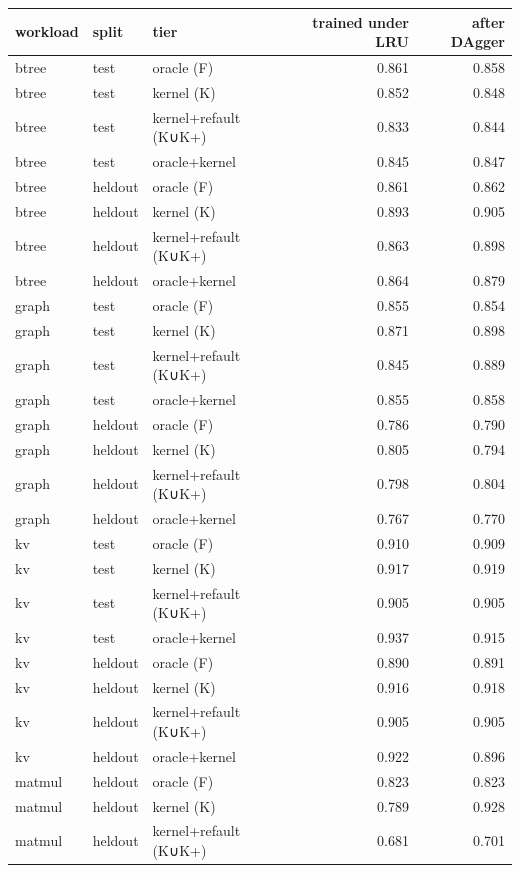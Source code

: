 \documentclass[10pt,a4paper]{article}
\begin{document}
{\footnotesize\setlength{\tabcolsep}{4pt}
\begin{longtable}{lllrr}
\toprule
\textbf{workload} & \textbf{split} & \textbf{tier} & \textbf{trained under LRU} & \textbf{after DAgger} \\ \midrule
\endhead
btree & test & oracle (F) & 0.861 & 0.858 \\
btree & test & kernel (K) & 0.852 & 0.848 \\
btree & test & kernel+refault (K∪K+) & 0.833 & 0.844 \\
btree & test & oracle+kernel & 0.845 & 0.847 \\
btree & heldout & oracle (F) & 0.861 & 0.862 \\
btree & heldout & kernel (K) & 0.893 & 0.905 \\
btree & heldout & kernel+refault (K∪K+) & 0.863 & 0.898 \\
btree & heldout & oracle+kernel & 0.864 & 0.879 \\
graph & test & oracle (F) & 0.855 & 0.854 \\
graph & test & kernel (K) & 0.871 & 0.898 \\
graph & test & kernel+refault (K∪K+) & 0.845 & 0.889 \\
graph & test & oracle+kernel & 0.855 & 0.858 \\
graph & heldout & oracle (F) & 0.786 & 0.790 \\
graph & heldout & kernel (K) & 0.805 & 0.794 \\
graph & heldout & kernel+refault (K∪K+) & 0.798 & 0.804 \\
graph & heldout & oracle+kernel & 0.767 & 0.770 \\
kv & test & oracle (F) & 0.910 & 0.909 \\
kv & test & kernel (K) & 0.917 & 0.919 \\
kv & test & kernel+refault (K∪K+) & 0.905 & 0.905 \\
kv & test & oracle+kernel & 0.937 & 0.915 \\
kv & heldout & oracle (F) & 0.890 & 0.891 \\
kv & heldout & kernel (K) & 0.916 & 0.918 \\
kv & heldout & kernel+refault (K∪K+) & 0.905 & 0.905 \\
kv & heldout & oracle+kernel & 0.922 & 0.896 \\
matmul & heldout & oracle (F) & 0.823 & 0.823 \\
matmul & heldout & kernel (K) & 0.789 & 0.928 \\
matmul & heldout & kernel+refault (K∪K+) & 0.681 & 0.701 \\

\end{longtable}}
\end{document}

